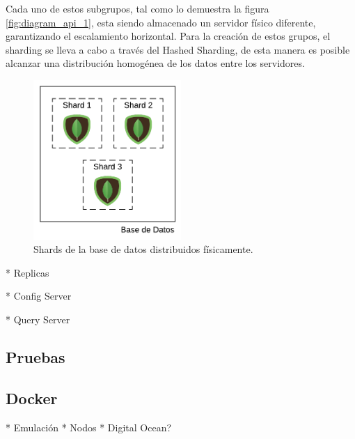 Cada uno de estos subgrupos, tal como lo demuestra la figura \ref{fig:diagram_api_1}, esta siendo almacenado un servidor físico diferente, garantizando el escalamiento horizontal.
Para la creación de estos grupos, el sharding se lleva a cabo a través del Hashed Sharding, de esta manera es
posible alcanzar una distribución homogénea de los datos entre los servidores.

\begin{figure}[H]
	\centering
		\includegraphics[width=0.5\textwidth]{figures/shards_distributed}
	\caption{Shards de la base de datos distribuidos físicamente.}
	\label{fig:shards_distributed}
\end{figure}


* Replicas

* Config Server

* Query Server


\subsection{Pruebas}


\subsection{Docker}

* Emulación
* Nodos
* Digital Ocean?
